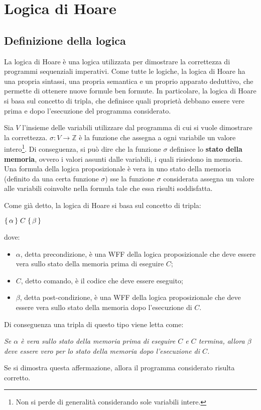 \chapter{Logica di Hoare}
\section{Definizione della logica}
La logica di Hoare è una logica utilizzata per dimostrare la correttezza di
programmi sequenziali imperativi. Come tutte le logiche, la logica di Hoare
ha una propria sintassi, una propria semantica e un proprio apparato deduttivo,
che permette di ottenere nuove formule ben formute.
In particolare, la logica di Hoare si basa sul concetto di tripla, che definisce
quali proprietà debbano essere vere prima e dopo l'esecuzione del programma
considerato.

Sia $V$ l'insieme delle variabili utilizzare dal programma di cui si vuole
dimostrare la correttezza.
$\sigma: V \rightarrow \mathbb{Z}$ è la funzione che assegna
a ogni variabile un valore intero\footnote{Non si perde di generalità
considerando sole variabili intere.}. Di conseguenza, si può dire
che la funzione $\sigma$ definisce lo \textbf{stato della memoria},
ovvero i valori assunti dalle variabili, i quali risiedono in memoria.
Una formula della logica proposizionale è vera in uno stato della memoria
(definito da una certa funzione $\sigma$) sse la funzione $\sigma$
considerata assegna un valore alle variabili coinvolte nella formula tale
che essa risulti soddisfatta.

Come già detto, la logica di Hoare si basa sul concetto di tripla:
\begin{center}
    $\Hoaretriple{\alpha}{C}{\beta}$
\end{center}
dove:
\begin{itemize}
    \item $\alpha$, detta precondizione, è una WFF della logica proposizionale
    che deve essere vera sullo stato della memoria prima di eseguire $C$;
    \item $C$, detto comando, è il codice che deve essere eseguito;
    \item $\beta$, detta post-condizione, è una WFF della logica proposizionale
    che deve essere vera sullo stato della memoria dopo l'esecuzione di $C$.
\end{itemize}
Di conseguenza una tripla di questo tipo viene letta come:
\begin{center}
    \textit{Se $\alpha$ è vera sullo stato della memoria prima di eseguire $C$
    e $C$ termina, allora $\beta$ deve essere vero per lo stato della memoria
    dopo l'esecuzione di $C$.}
\end{center}
Se si dimostra questa affermazione, allora il programma  considerato
risulta corretto.


